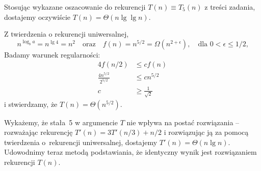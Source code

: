 % 

Stosując wykazane oszacowanie do rekurencji $T(n)\equiv T_5(n)$ z treści zadania, dostajemy oczywiście $T(n)=\Theta(n\lg\lg n)$.

\subproblem %
Z twierdzenia o rekurencji uniwersalnej,
\[
	n^{\log_ba} = n^{\lg4} = n^2 \quad\text{oraz}\quad f(n) = n^{5/2} = \Omega(n^{2+\epsilon}), \quad\text{dla $0<\epsilon\le1/2$,}
\]
Badamy warunek regularności:
\begin{align*}
	4f(n/2) &\le cf(n) \\
	\frac{4n^{5/2}}{2^{5/2}} &\le cn^{5/2} \\
	c &\ge \frac{1}{\sqrt{2}}
\end{align*}
i stwierdzamy, że $T(n)=\Theta(n^{5/2})$.

\subproblem %
Wykażemy, że stała~5 w argumencie $T$ nie wpływa na postać rozwiązania -- rozważając rekurencję $T'(n)=3T'(n/3)+n/2$ i rozwiązując ją za pomocą twierdzenia o~rekurencji uniwersalnej, dostajemy $T'(n)=\Theta(n\lg n)$. Udowodnimy teraz metodą podstawiania, że identyczny wynik jest rozwiązaniem rekurencji $T(n)$.

